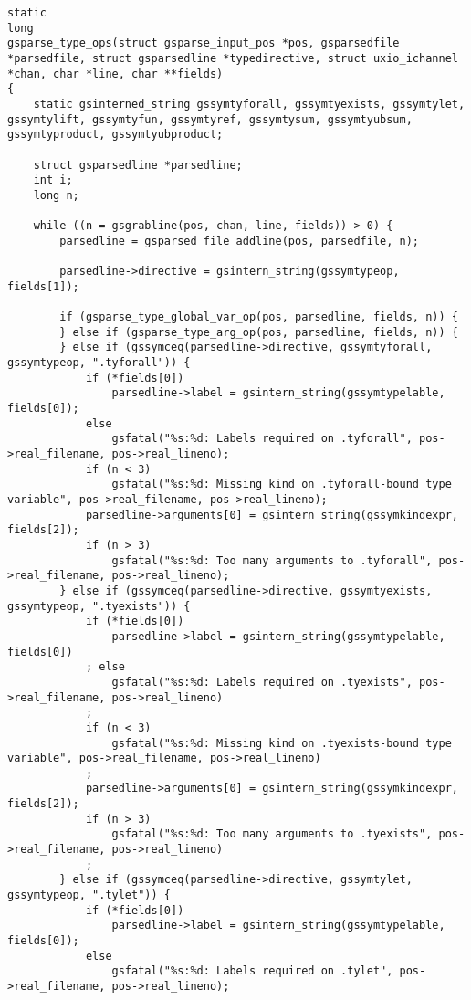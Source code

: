 \documentclass{report}
\begin{document}
\begin{verbatim}
static
long
gsparse_type_ops(struct gsparse_input_pos *pos, gsparsedfile *parsedfile, struct gsparsedline *typedirective, struct uxio_ichannel *chan, char *line, char **fields)
{
    static gsinterned_string gssymtyforall, gssymtyexists, gssymtylet, gssymtylift, gssymtyfun, gssymtyref, gssymtysum, gssymtyubsum, gssymtyproduct, gssymtyubproduct;

    struct gsparsedline *parsedline;
    int i;
    long n;

    while ((n = gsgrabline(pos, chan, line, fields)) > 0) {
        parsedline = gsparsed_file_addline(pos, parsedfile, n);

        parsedline->directive = gsintern_string(gssymtypeop, fields[1]);

        if (gsparse_type_global_var_op(pos, parsedline, fields, n)) {
        } else if (gsparse_type_arg_op(pos, parsedline, fields, n)) {
        } else if (gssymceq(parsedline->directive, gssymtyforall, gssymtypeop, ".tyforall")) {
            if (*fields[0])
                parsedline->label = gsintern_string(gssymtypelable, fields[0]);
            else
                gsfatal("%s:%d: Labels required on .tyforall", pos->real_filename, pos->real_lineno);
            if (n < 3)
                gsfatal("%s:%d: Missing kind on .tyforall-bound type variable", pos->real_filename, pos->real_lineno);
            parsedline->arguments[0] = gsintern_string(gssymkindexpr, fields[2]);
            if (n > 3)
                gsfatal("%s:%d: Too many arguments to .tyforall", pos->real_filename, pos->real_lineno);
        } else if (gssymceq(parsedline->directive, gssymtyexists, gssymtypeop, ".tyexists")) {
            if (*fields[0])
                parsedline->label = gsintern_string(gssymtypelable, fields[0])
            ; else
                gsfatal("%s:%d: Labels required on .tyexists", pos->real_filename, pos->real_lineno)
            ;
            if (n < 3)
                gsfatal("%s:%d: Missing kind on .tyexists-bound type variable", pos->real_filename, pos->real_lineno)
            ;
            parsedline->arguments[0] = gsintern_string(gssymkindexpr, fields[2]);
            if (n > 3)
                gsfatal("%s:%d: Too many arguments to .tyexists", pos->real_filename, pos->real_lineno)
            ;
        } else if (gssymceq(parsedline->directive, gssymtylet, gssymtypeop, ".tylet")) {
            if (*fields[0])
                parsedline->label = gsintern_string(gssymtypelable, fields[0]);
            else
                gsfatal("%s:%d: Labels required on .tylet", pos->real_filename, pos->real_lineno);

\end{verbatim}
\end{document}
